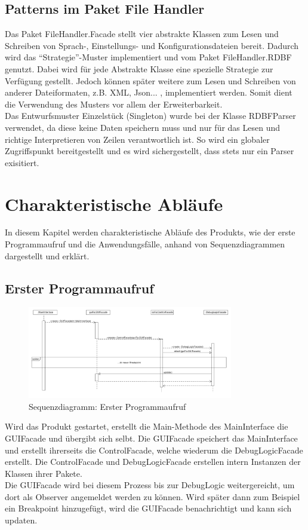\documentclass[parskip=full]{scrartcl}
\begin{document}
\subsection{Patterns im Paket File Handler}
Das Paket FileHandler.Facade stellt vier abstrakte Klassen zum Lesen und Schreiben von Sprach-, Einstellungs- und Konfigurationsdateien bereit. Dadurch wird das \enquote{Strategie}-Muster implementiert und vom Paket FileHandler.RDBF genutzt. Dabei wird für jede Abstrakte Klasse eine spezielle Strategie zur Verfügung gestellt. Jedoch können später weitere zum Lesen und Schreiben von anderer Dateiformaten, z.B. XML, Json... , implementiert werden. Somit dient die Verwendung des Musters vor allem der Erweiterbarkeit.\\
Das Entwurfsmuster Einzelstück (Singleton) wurde bei der Klasse RDBFParser verwendet, da diese keine Daten speichern muss und nur für das Lesen und richtige Interpretieren von Zeilen verantwortlich ist. So wird  ein globaler Zugriffspunkt bereitgestellt und es wird sichergestellt, dass stets nur ein Parser exisitiert.

\newpage
\section{Charakteristische Abläufe}\label{charAbl}
In diesem Kapitel werden charakteristische Abläufe des Produkts, wie der erste Programmaufruf und die
Anwendungsfälle, anhand von Sequenzdiagrammen dargestellt und erklärt.

\subsection{Erster Programmaufruf}
\begin{figure}[!h]
\centering
\includegraphics[width=0.8\textwidth]{diagrammIdeenUmlet/SequenceDiagrams/seq_firstCallPDF.pdf}
\caption{Sequenzdiagramm: Erster Programmaufruf}
\end{figure}
Wird das Produkt gestartet, erstellt die Main-Methode des MainInterface die GUIFacade und übergibt sich selbt.
Die GUIFacade speichert das MainInterface und erstellt ihrerseits die ControlFacade, welche wiederum
die DebugLogicFacade erstellt.
Die ControlFacade und DebugLogicFacade erstellen intern Instanzen der Klassen ihrer Pakete. \\
Die GUIFacade wird bei diesem Prozess bis zur DebugLogic weitergereicht, um dort als Observer angemeldet werden
zu können. Wird später dann zum Beispiel ein Breakpoint hinzugefügt, wird die GUIFacade benachrichtigt und
kann sich updaten.
\end{document}
